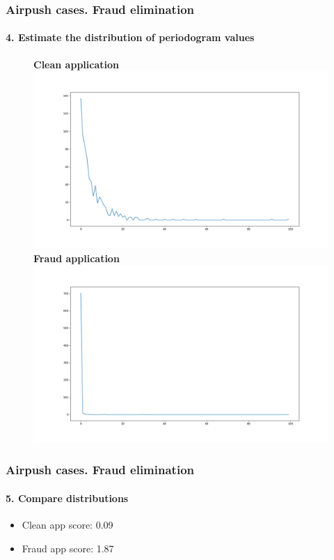 \documentclass[intlimits, 9pt, unicode]{beamer}
\begin{document}
\begin{frame}
    \frametitle{Airpush cases. Fraud elimination}
    \framesubtitle{4. Estimate the distribution of periodogram values}
    \begin{figure}
	\textbf{Clean application}
	\includegraphics[scale=0.10]{images/015_case_1}
	\textbf{Fraud application}
	\includegraphics[scale=0.10]{images/016_case_1}
     \end{figure}
\end{frame}

\begin{frame}
    \frametitle{Airpush cases. Fraud elimination}
    \framesubtitle{5. Compare distributions}
    \begin{itemize}
    	\item Clean app score: 0.09
	\item Fraud app score: 1.87
    \end{itemize}
\end{frame}
\end{document}
